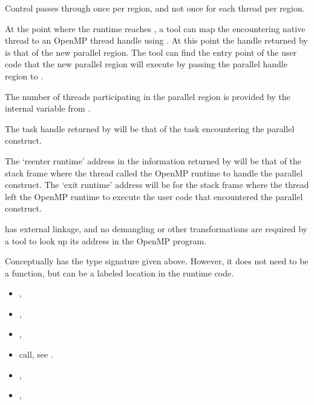 Control passes through 
once per region, and not once for each thread per region.

At the point where the runtime reaches ,
a tool can map the encountering native thread to an OpenMP
thread handle using
.
At this point the handle returned by 
is that of the new parallel region.
The tool can find the entry point of the user code that
the new parallel region will execute by passing the parallel handle region
to .

The number of threads participating in the parallel region is provided by
the internal variable  from .

The task handle returned by
will be that of the task encountering the parallel construct.

The `reenter runtime' address in the information returned by
will be that of the stack frame where the thread called the OpenMP
runtime to handle the parallel construct.
The `exit runtime' address will be for the stack frame where the thread
left the OpenMP runtime to execute the user code that encountered
the parallel construct.

\restrictions

 has external  linkage, and no
demangling or other transformations are required by a tool
to look up its address in the OpenMP program.

Conceptually  has the type signature
given above.
However, it does not need to be a function, but can be a labeled location
in the runtime code.

\crossreferences

\begin{itemize}
\item
  , 
\item
  , 
\item
  , 
\item {} call, see 
  .
\item
  , 
\item
  , 
\end{itemize}

